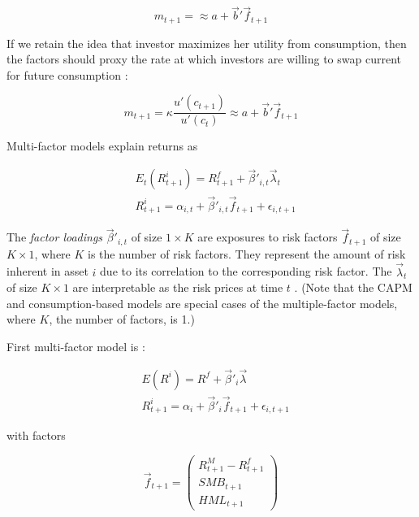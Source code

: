	 		\begin{equation*}
	 		m_{t+1} = \approx a+\vec{b}'\vec{f}_{t+1}
	 		\end{equation*}
	 		
	 		
	 		If we retain the idea that investor maximizes her utility from consumption, then the factors  should proxy the rate at which investors are willing to swap current for future consumption \citep{cochrane2009asset}:  
	 		
	 		\begin{equation*}
	 			m_{t+1} = \kappa \frac{u'(c_{t+1})}{u'(c_t)} \approx a+\vec{b}'\vec{f}_{t+1}
	 		\end{equation*}
	 		
	 		Multi-factor models explain returns as	 
	 	
			 	\begin{align}
			 		& E_t(R^i_{t+1}) = R^f_{t+1} + \vec{\beta}'_{i,t} \vec{\lambda}_{t} \\
			 		& R^i_{t+1} = \alpha_{i,t} + \vec{\beta}'_{i,t} \vec{f}_{t+1} + \epsilon_{i,t+1} \label{multifactor model}
			 	\end{align}
			 
			 The \textit{factor loadings} $\vec{\beta}'_{i,t}$ of size $1\times K$ are exposures to risk factors $\vec{f}_{t+1}$ of size $K \times 1$, where $K$ is the number of risk factors. They represent the amount of risk inherent in asset $i$ due to its correlation to the corresponding risk factor. The $\vec{\lambda}_{t}$ of size $K \times 1$ are interpretable as the risk prices at time $t$ \citep{kelly2019characteristics}. (Note that the CAPM and consumption-based models are special cases of the multiple-factor models, where $K$, the number of factors, is 1.) 			
			 
			 First multi-factor model is \cite{fama1996multifactor}:
			 
			 \begin{align}
			 	& E(R^i) = R^f + \vec{\beta}'_{i} \vec{\lambda} \\
			 	& R^i_{t+1} = \alpha_{i} + \vec{\beta}'_{i} \vec{f}_{t+1} + \epsilon_{i,t+1}
			 \end{align}
		 
		 	with factors  
			  		
				\begin{equation}
					\vec{f}_{t+1} = 
						\begin{pmatrix}
							R^M_{t+1}-R^f_{t+1} \\
							SMB_{t+1} \\
							HML_{t+1}				
						\end{pmatrix}
				\end{equation}
			
